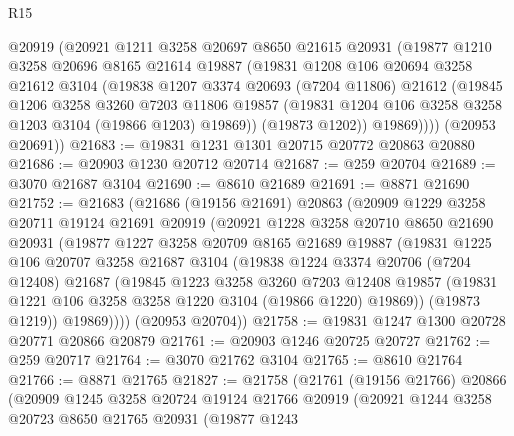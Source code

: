 \begin{lexlean}{R15}
\begin{coremodule}
        @20919
        (@20921
          @1211
          @3258
          @20697
          @8650
          @21615
          @20931
          (@19877
            @1210
            @3258
            @20696
            @8165
            @21614
            @19887
            (@19831
              @1208
              @106
              @20694
              @3258
              @21612
              @3104
              (@19838
                @1207
                @3374
                @20693
                (@7204 @11806)
                @21612
                (@19845
                  @1206
                  @3258
                  @3260
                  @7203
                  @11806
                  @19857
                  (@19831 @1204 @106 @3258 @3258 @1203 @3104 (@19866 @1203) @19869))
                (@19873 @1202))
              @19869))))
      (@20953 @20691))
@21683 := @19831 @1231 @1301 @20715 @20772 @20863 @20880
@21686 := @20903 @1230 @20712 @20714
@21687 := @259 @20704
@21689 := @3070 @21687 @3104
@21690 := @8610 @21689
@21691 := @8871 @21690
@21752 := @21683
    (@21686
      (@19156 @21691)
      @20863
      (@20909
        @1229
        @3258
        @20711
        @19124
        @21691
        @20919
        (@20921
          @1228
          @3258
          @20710
          @8650
          @21690
          @20931
          (@19877
            @1227
            @3258
            @20709
            @8165
            @21689
            @19887
            (@19831
              @1225
              @106
              @20707
              @3258
              @21687
              @3104
              (@19838
                @1224
                @3374
                @20706
                (@7204 @12408)
                @21687
                (@19845
                  @1223
                  @3258
                  @3260
                  @7203
                  @12408
                  @19857
                  (@19831 @1221 @106 @3258 @3258 @1220 @3104 (@19866 @1220) @19869))
                (@19873 @1219))
              @19869))))
      (@20953 @20704))
@21758 := @19831 @1247 @1300 @20728 @20771 @20866 @20879
@21761 := @20903 @1246 @20725 @20727
@21762 := @259 @20717
@21764 := @3070 @21762 @3104
@21765 := @8610 @21764
@21766 := @8871 @21765
@21827 := @21758
    (@21761
      (@19156 @21766)
      @20866
      (@20909
        @1245
        @3258
        @20724
        @19124
        @21766
        @20919
        (@20921
          @1244
          @3258
          @20723
          @8650
          @21765
          @20931
          (@19877
            @1243

\end{coremodule}
\end{lexlean}
